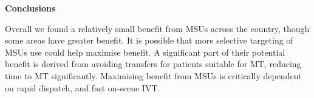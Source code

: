 \textbf{Conclusions}

Overall we found a relatively small benefit from MSUs across the country, though some areas have greater benefit. It is possible that more selective targeting of MSUs use could help maximise benefit. A significant part of their potential benefit is derived from avoiding transfers for patients suitable for MT, reducing time to MT significantly. Maximising benefit from MSUs is critically dependent on rapid dispatch, and fast on-scene IVT.